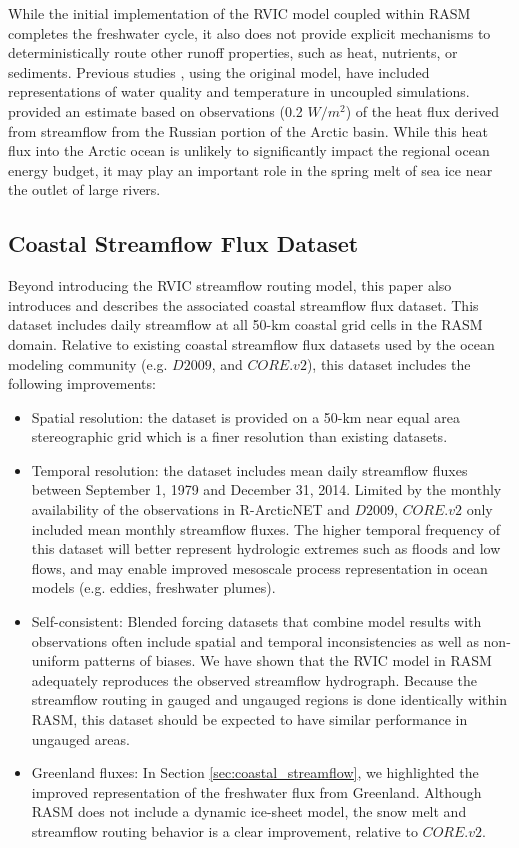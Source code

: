 \documentclass[jgrga, draft]{agutex}
\begin{document}
\begin{article}
While the initial implementation of the RVIC model coupled within RASM completes the freshwater cycle, it also does not provide explicit mechanisms to deterministically route other runoff properties, such as heat, nutrients, or sediments.
Previous studies \citep[e.g.][]{vanVliet_2011,vanVliet_2012}, using the original \citet{Lohmann_1996} model, have included representations of water quality and temperature in uncoupled simulations.
\citet{Lammers_2007} provided an estimate based on observations (0.2 $W/m^2$) of the heat flux derived from streamflow from the Russian portion of the Arctic basin.
While this heat flux into the Arctic ocean is unlikely to significantly impact the regional ocean energy budget, it may play an important role in the spring melt of sea ice near the outlet of large rivers.

\subsection{Coastal Streamflow Flux Dataset}
Beyond introducing the RVIC streamflow routing model, this paper also introduces and describes the associated coastal streamflow flux dataset.
This dataset includes daily streamflow at all 50-km coastal grid cells in the RASM domain.
Relative to existing coastal streamflow flux datasets used by the ocean modeling community (e.g. $D2009$, and $CORE.v2$), this dataset includes the following improvements:

\begin{itemize}[leftmargin=+.5in]
  \item Spatial resolution: the dataset is provided on a 50-km near equal area stereographic grid which is a finer resolution than existing datasets.
  \item Temporal resolution: the dataset includes mean daily streamflow fluxes between September 1, 1979 and December 31, 2014. Limited by the monthly availability of the observations in R-ArcticNET and $D2009$, $CORE.v2$ only included mean monthly streamflow fluxes.
  The higher temporal frequency of this dataset will better represent hydrologic extremes such as floods and low flows, and may enable improved mesoscale process representation in ocean models (e.g. eddies, freshwater plumes).
  \item Self-consistent: Blended forcing datasets that combine model results with observations often include spatial and temporal inconsistencies as well as non-uniform patterns of biases. We have shown that the RVIC model in RASM adequately reproduces the observed streamflow hydrograph. Because the streamflow routing in gauged and ungauged regions is done identically within RASM, this dataset should be expected to have similar performance in ungauged areas.
  \item Greenland fluxes: In Section \ref{sec:coastal_streamflow}, we highlighted the improved representation of the freshwater flux from Greenland. Although RASM does not include a dynamic ice-sheet model, the snow melt and streamflow routing behavior is a clear improvement, relative to $CORE.v2$.
\end{itemize}


\end{article}
\end{document}
